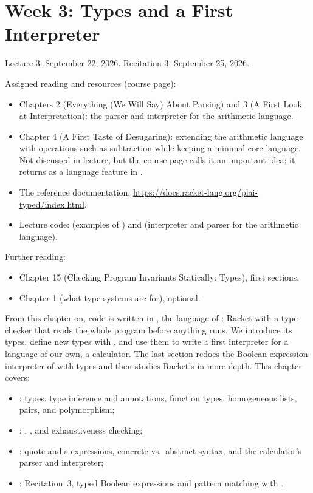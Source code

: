 \chapter{Week 3: Types and a First Interpreter}
\label{ch:week3}

Lecture 3: September 22, 2026. Recitation 3: September 25, 2026.

Assigned reading and resources (course page):
\begin{itemize}
  \item \cite{PLAI} Chapters 2 (Everything (We Will Say) About Parsing) and 3 (A First Look at Interpretation): the parser and interpreter for the arithmetic language.
  \item \cite{PLAI} Chapter 4 (A First Taste of Desugaring): extending the arithmetic language with operations such as subtraction while keeping a minimal core language. Not discussed in lecture, but the course page calls it an important idea; it returns as a language feature in .
  \item The  reference documentation, \url{https://docs.racket-lang.org/plai-typed/index.html}.
  \item Lecture code:  (examples of ) and  (interpreter and parser for the arithmetic language).
\end{itemize}

Further reading:
\begin{itemize}
  \item \cite{PLAI} Chapter 15 (Checking Program Invariants Statically: Types), first sections.
  \item \cite{TAPL} Chapter 1 (what type systems are for), optional.
\end{itemize}

From this chapter on, code is written in , the language of \cite{PLAI}: Racket with a type checker that reads the whole program before anything runs. We introduce its types, define new types with , and use them to write a first interpreter for a language of our own, a calculator. The last section redoes the Boolean-expression interpreter of  with types and then studies Racket's  in more depth. This chapter covers:
\begin{itemize}
  \item {}: types, type inference and annotations, function types, homogeneous lists, pairs, and polymorphism;
  \item {}: , , and exhaustiveness checking;
  \item {}: quote and s-expressions, concrete vs.\ abstract syntax, and the calculator's parser and interpreter;
  \item {}: Recitation~3, typed Boolean expressions and pattern matching with .
\end{itemize}






